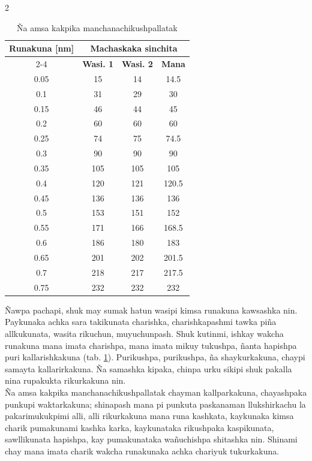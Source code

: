 \documentclass[11pt,a4paper]{article}
\begin{document}
\begin{multicols}{2}
\begin{table}[H]
  \centering
    \begin{tabular}{c|c|c|c}
	\multirow{2}{*}{{\small \textbf{Runakuna [nm]}}}&  \multicolumn{3}{c}{\textbf{Machaskaka sinchita}}  \\ 
	\cline{2-4}
	 &\textbf{Wasi. 1} &\textbf{Wasi. 2} & {\small \textbf{Mana}} \\ \hline
    0.05 & 15 & 14 & 14.5 \\ \hline
    0.1 & 31 & 29 & 30 \\ \hline
    0.15 & 46 & 44 & 45 \\ \hline
    0.2 & 60 & 60 & 60 \\ \hline
    0.25 & 74 & 75 & 74.5 \\ \hline
    0.3 & 90 & 90 & 90 \\ \hline
    0.35 & 105 & 105 & 105 \\ \hline
    0.4 & 120 & 121 & 120.5 \\ \hline
    0.45 & 136 & 136 & 136 \\ \hline
    0.5 & 153 & 151 & 152 \\ \hline
    0.55 & 171 & 166 & 168.5 \\ \hline
    0.6 & 186 & 180 & 183 \\ \hline
    0.65 & 201 & 202 & 201.5 \\ \hline
    0.7 & 218 & 217 & 217.5 \\ \hline
    0.75 & 232 & 232 & 232 \\
    \end{tabular}%
    \caption{Ña amsa kakpika manchanachikushpallatak}
  \label{t_data}%
\end{table}%

Ñawpa pachapi, shuk may sumak hatun wasipi kimsa runakuna kawsashka nin. Paykunaka achka sara takikunata charishka, charishkapashmi tawka piña allkukunata, wasita rikuchun, muyuchunpash. Shuk kutinmi, ishkay wakcha runakuna mana imata charishpa, mana imata mikuy tukushpa, ñanta hapishpa puri kallarishkakuna (tab. \ref{t_data}). Purikushpa, purikushpa, ña shaykurkakuna, chaypi samayta kallarirkakuna. Ña samashka kipaka, chinpa urku sikipi shuk pakalla nina rupakukta rikurkakuna nin. \\

Ña amsa kakpika manchanachikushpallatak chayman kallparkakuna, chayashpaka punkupi waktarkakuna; shinapash mana pi punkuta paskanaman llukshirkachu la pakarimukukpimi alli, alli rikurkakuna mana runa kashkata, kaykunaka kimsa charik pumakunami kashka karka, kaykunataka rikushpaka kaspikunata, sawllikunata hapishpa, kay pumakunataka wañuchishpa shitashka nin. Shinami chay mana imata charik wakcha runakunaka achka chariyuk tukurkakuna.


\end{multicols}
\end{document}

